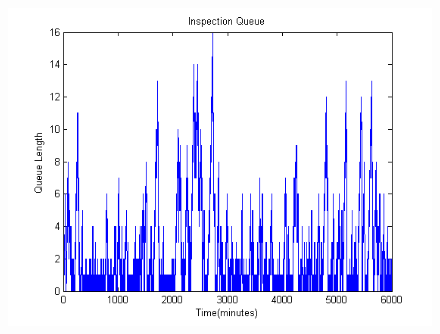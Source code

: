 \documentclass[aps,letterpaper,10pt]{revtex4}
\begin{document}
\begin{itemize}
\begin{figure}[htp]
\begin{center}
{                            \includegraphics[scale=0.5]{../analysis/5/Images/inspection_queue.png}
                        }
                        \end{center}
                    \end{figure}
            \end{itemize}

        \newpage
\end{document}
